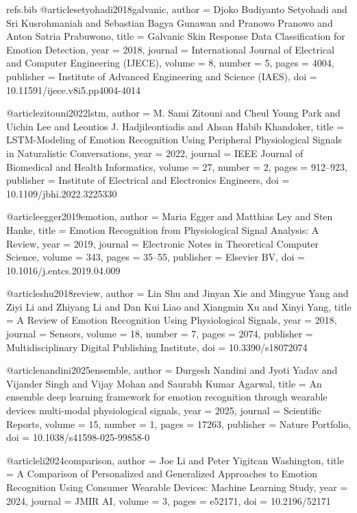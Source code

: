 \begin{filecontents*}[overwrite]{refs.bib}
@article{setyohadi2018galvanic,
  author = {Djoko Budiyanto Setyohadi and Sri Kusrohmaniah and Sebastian Bagya Gunawan and Pranowo Pranowo and Anton Satria Prabuwono},
  title = {{Galvanic Skin Response Data Classification for Emotion Detection}},
  year = {2018},
  journal = {International Journal of Electrical and Computer Engineering (IJECE)},
  volume = {8},
  number = {5},
  pages = {4004},
  publisher = {Institute of Advanced Engineering and Science (IAES)},
  doi = {10.11591/ijece.v8i5.pp4004-4014}
}

@article{zitouni2022lstm,
  author = {M. Sami Zitouni and Cheul Young Park and Uichin Lee and Leontios J. Hadjileontiadis and Ahsan Habib Khandoker},
  title = {{LSTM-Modeling of Emotion Recognition Using Peripheral Physiological Signals in Naturalistic Conversations}},
  year = {2022},
  journal = {IEEE Journal of Biomedical and Health Informatics},
  volume = {27},
  number = {2},
  pages = {912--923},
  publisher = {Institute of Electrical and Electronics Engineers},
  doi = {10.1109/jbhi.2022.3225330}
}

@article{egger2019emotion,
  author = {Maria Egger and Matthias Ley and Sten Hanke},
  title = {{Emotion Recognition from Physiological Signal Analysis: A Review}},
  year = {2019},
  journal = {Electronic Notes in Theoretical Computer Science},
  volume = {343},
  pages = {35--55},
  publisher = {Elsevier BV},
  doi = {10.1016/j.entcs.2019.04.009}
}

@article{shu2018review,
  author = {Lin Shu and Jinyan Xie and Mingyue Yang and Ziyi Li and Zhiyang Li and Dan Kui Liao and Xiangmin Xu and Xinyi Yang},
  title = {{A Review of Emotion Recognition Using Physiological Signals}},
  year = {2018},
  journal = {Sensors},
  volume = {18},
  number = {7},
  pages = {2074},
  publisher = {Multidisciplinary Digital Publishing Institute},
  doi = {10.3390/s18072074}
}

@article{nandini2025ensemble,
  author = {Durgesh Nandini and Jyoti Yadav and Vijander Singh and Vijay Mohan and Saurabh Kumar Agarwal},
  title = {{An ensemble deep learning framework for emotion recognition through wearable devices multi-modal physiological signals}},
  year = {2025},
  journal = {Scientific Reports},
  volume = {15},
  number = {1},
  pages = {17263},
  publisher = {Nature Portfolio},
  doi = {10.1038/s41598-025-99858-0}
}

@article{li2024comparison,
  author = {Joe Li and Peter Yigitcan Washington},
  title = {{A Comparison of Personalized and Generalized Approaches to Emotion Recognition Using Consumer Wearable Devices: Machine Learning Study}},
  year = {2024},
  journal = {JMIR AI},
  volume = {3},
  pages = {e52171},
  doi = {10.2196/52171}
}


\end{filecontents*}
